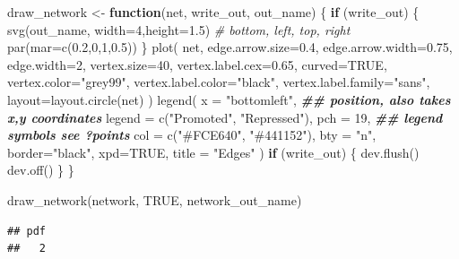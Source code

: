\documentclass[
]{book}
\newenvironment{Shaded}{\begin{snugshade}}{\end{snugshade}}
\newcommand{\AttributeTok}[1]{\textcolor[rgb]{0.77,0.63,0.00}{#1}}
\newcommand{\CommentTok}[1]{\textcolor[rgb]{0.56,0.35,0.01}{\textit{#1}}}
\newcommand{\ConstantTok}[1]{\textcolor[rgb]{0.00,0.00,0.00}{#1}}
\newcommand{\ControlFlowTok}[1]{\textcolor[rgb]{0.13,0.29,0.53}{\textbf{#1}}}
\newcommand{\DecValTok}[1]{\textcolor[rgb]{0.00,0.00,0.81}{#1}}
\newcommand{\DocumentationTok}[1]{\textcolor[rgb]{0.56,0.35,0.01}{\textbf{\textit{#1}}}}
\newcommand{\FloatTok}[1]{\textcolor[rgb]{0.00,0.00,0.81}{#1}}
\newcommand{\FunctionTok}[1]{\textcolor[rgb]{0.00,0.00,0.00}{#1}}
\newcommand{\NormalTok}[1]{#1}
\newcommand{\OtherTok}[1]{\textcolor[rgb]{0.56,0.35,0.01}{#1}}
\newcommand{\StringTok}[1]{\textcolor[rgb]{0.31,0.60,0.02}{#1}}
\begin{document}
\begin{Shaded}
\begin{Highlighting}[]
\NormalTok{draw\_network }\OtherTok{\textless{}{-}} \ControlFlowTok{function}\NormalTok{(net, write\_out, out\_name) \{}
  \ControlFlowTok{if}\NormalTok{ (write\_out) \{}
    \FunctionTok{svg}\NormalTok{(out\_name, }\AttributeTok{width=}\DecValTok{4}\NormalTok{,}\AttributeTok{height=}\FloatTok{1.5}\NormalTok{)}
    \CommentTok{\# bottom, left, top, right}
    \FunctionTok{par}\NormalTok{(}\AttributeTok{mar=}\FunctionTok{c}\NormalTok{(}\FloatTok{0.2}\NormalTok{,}\DecValTok{0}\NormalTok{,}\DecValTok{1}\NormalTok{,}\FloatTok{0.5}\NormalTok{))}
\NormalTok{  \}}
  \FunctionTok{plot}\NormalTok{(}
\NormalTok{    net,}
    \AttributeTok{edge.arrow.size=}\FloatTok{0.4}\NormalTok{,}
    \AttributeTok{edge.arrow.width=}\FloatTok{0.75}\NormalTok{,}
    \AttributeTok{edge.width=}\DecValTok{2}\NormalTok{,}
    \AttributeTok{vertex.size=}\DecValTok{40}\NormalTok{,}
    \AttributeTok{vertex.label.cex=}\FloatTok{0.65}\NormalTok{,}
    \AttributeTok{curved=}\ConstantTok{TRUE}\NormalTok{,}
    \AttributeTok{vertex.color=}\StringTok{"grey99"}\NormalTok{,}
    \AttributeTok{vertex.label.color=}\StringTok{"black"}\NormalTok{,}
    \AttributeTok{vertex.label.family=}\StringTok{"sans"}\NormalTok{,}
    \AttributeTok{layout=}\FunctionTok{layout.circle}\NormalTok{(net)}
\NormalTok{  )}
  \FunctionTok{legend}\NormalTok{(}
    \AttributeTok{x =} \StringTok{"bottomleft"}\NormalTok{,      }\DocumentationTok{\#\# position, also takes x,y coordinates}
    \AttributeTok{legend =} \FunctionTok{c}\NormalTok{(}\StringTok{"Promoted"}\NormalTok{, }\StringTok{"Repressed"}\NormalTok{),}
    \AttributeTok{pch =} \DecValTok{19}\NormalTok{,              }\DocumentationTok{\#\# legend symbols see ?points}
    \AttributeTok{col =} \FunctionTok{c}\NormalTok{(}\StringTok{"\#FCE640"}\NormalTok{, }\StringTok{"\#441152"}\NormalTok{),}
    \AttributeTok{bty =} \StringTok{"n"}\NormalTok{,}
    \AttributeTok{border=}\StringTok{"black"}\NormalTok{,}
    \AttributeTok{xpd=}\ConstantTok{TRUE}\NormalTok{,}
    \AttributeTok{title =} \StringTok{"Edges"}
\NormalTok{  )}
  \ControlFlowTok{if}\NormalTok{ (write\_out) \{}
    \FunctionTok{dev.flush}\NormalTok{()}
    \FunctionTok{dev.off}\NormalTok{()}
\NormalTok{  \}}
\NormalTok{\}}

\FunctionTok{draw\_network}\NormalTok{(network, }\ConstantTok{TRUE}\NormalTok{, network\_out\_name)}
\end{Highlighting}
\end{Shaded}

\begin{verbatim}
## pdf 
##   2
\end{verbatim}
\end{document}
